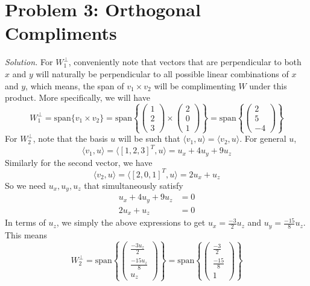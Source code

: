 \documentclass{article}
\begin{document}
\section*{Problem 3: Orthogonal Compliments}
\emph{Solution. }For $W_{1}^{\perp}$, conveniently note that vectors that are  perpendicular to both $x$ and $y$ will naturally be perpendicular to all possible linear combinations of $x$ and $y$, which means, the span of $v_1 \times v_2$ will be complimenting $W$ under this product. More specifically, we will have
\begin{equation*}
    W_{1}^{\perp} = \text{span}\{v_1\times v_2\} = \text{span}\left\{\begin{pmatrix}
        1 \\
        2 \\
        3
    \end{pmatrix} \times \begin{pmatrix}
        2\\
        0\\
        1
    \end{pmatrix}\right\} = \text{span}\left\{\begin{pmatrix}
        2\\
        5\\
        -4
    \end{pmatrix}\right\}
\end{equation*}
For $W_{2}^{\perp}$, note that the basis $u$ will be such that $\langle v_{1}, u\rangle = \langle v_2, u\rangle$. For general $u$, 
\begin{equation*}
    \langle v_{1}, u\rangle = \langle [1, 2, 3]^{T}, u\rangle = u_{x} + 4u_{y} + 9u_{z}
\end{equation*}
Similarly for the second vector, we have
\begin{equation*}
    \langle v_{2}, u \rangle = \langle [2, 0, 1]^{T}, u\rangle = 2u_{x} + u_{z}
\end{equation*}
So we need $u_{x}, u_{y}, u_{z}$ that simultaneously satisfy
\begin{align*}
    u_{x}  + 4u_{y} + 9u_{z} &= 0\\
    2u_{x} + u_{z} &= 0
\end{align*}
In terms of $u_{z}$, we simply the above expressions to get $u_{x} = \frac{-3}{2}u_{z}$ and $u_{y} = \frac{-15}{8}u_{z}$. This means
\begin{equation*}
    W_{2}^{\perp} = \text{span}\left\{\begin{pmatrix}
        \frac{-3u_{z}}{2}\\
        \frac{-15u_{z}}{8}\\
        u_{z}
    \end{pmatrix}\right\} = \text{span}\left\{\begin{pmatrix}
        \frac{-3}{2}\\
        \frac{-15}{8}\\
        1
    \end{pmatrix}\right\}
\end{equation*}
\end{document}
